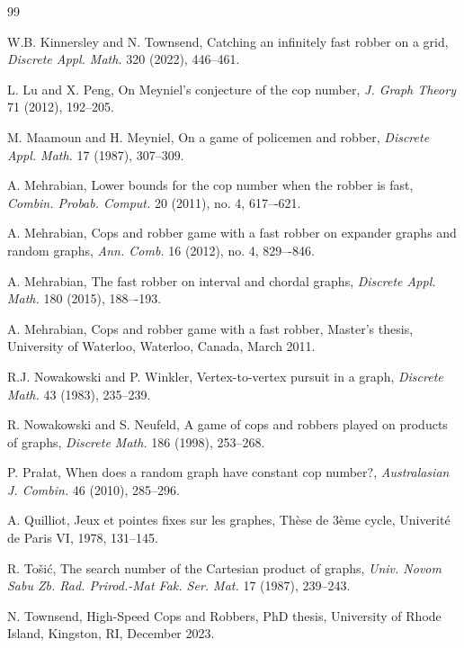\documentclass[12pt]{amsart}
\theoremstyle{definition}
\begin{document}
\begin{thebibliography}{99}

 W.B. Kinnersley and N. Townsend, Catching an infinitely fast robber on a grid, \textit{Discrete Appl. Math.} 320 (2022), 446--461.

 L. Lu and X. Peng, On Meyniel's conjecture of the cop number, \textit{J. Graph Theory} 71 (2012), 192--205.

 M. Maamoun and H. Meyniel, On a game of policemen and robber, \textit{Discrete Appl. Math.} 17 (1987), 307--309.

 A. Mehrabian, Lower bounds for the cop number when the robber is fast, \textit{Combin. Probab. Comput.} 20 (2011), no. 4, 617–-621.

 A. Mehrabian, Cops and robber game with a fast robber on expander graphs and random graphs, \textit{Ann. Comb.} 16 (2012), no. 4, 829–-846.

 A. Mehrabian, The fast robber on interval and chordal graphs, \textit{Discrete Appl. Math.} 180 (2015), 188–-193.

 A. Mehrabian, Cops and robber game with a fast robber, Master's thesis, University of Waterloo, Waterloo, Canada, March 2011.

 R.J. Nowakowski and P. Winkler, Vertex-to-vertex pursuit in a graph, \textit{Discrete Math.} 43 (1983), 235--239.

 R. Nowakowski and S. Neufeld, A game of cops and robbers played on products of graphs, \textit{Discrete Math.} 186 (1998), 253--268.

 P. Pra\l{}at, When does a random graph have constant cop number?, \textit{Australasian J. Combin.} 46 (2010), 285--296.

 A. Quilliot, Jeux et pointes fixes sur les graphes, Th\`{e}se de 3\`{e}me cycle, Univerit\'{e} de Paris VI, 1978, 131--145.

R. To\v{s}i\'{c}, The search number of the Cartesian product of graphs, \textit{Univ. Novom Sabu Zb. Rad. Prirod.-Mat Fak. Ser. Mat.} 17 (1987), 239--243. 

N. Townsend, High-Speed Cops and Robbers, PhD thesis, University of Rhode Island, Kingston, RI, December 2023.


\end{thebibliography}
\end{document}
